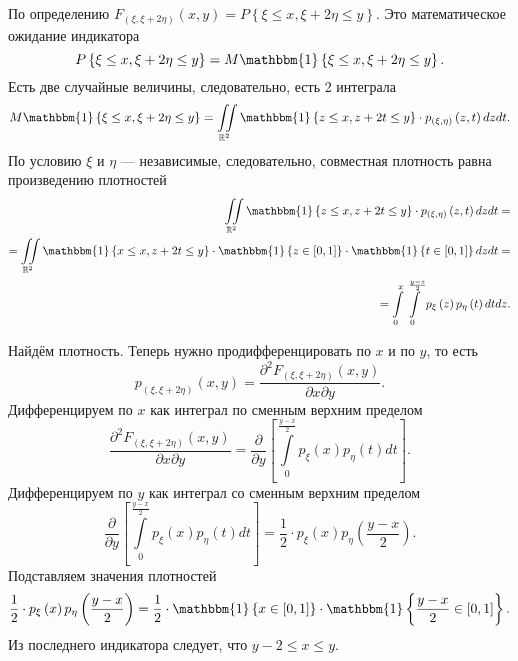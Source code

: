 \begin{enumerate}[label=\alph*)]
  По определению
  $F_{ \left( \xi, \xi + 2 \eta \right) } \left( x, y \right) =
    P \left\{ \xi \leq x, \xi + 2 \eta \leq y \right\} $.
  Это математическое ожидание индикатора
  $$P \left\{ \xi \leq x, \xi + 2 \eta \leq y \right\} =
    M \mathbbm{1} \left\{ \xi \leq x, \xi + 2 \eta \leq y \right\}.$$
  Есть две случайные величины, следовательно, есть 2 интеграла
  $$M \mathbbm{1} \left\{ \xi \leq x, \xi + 2 \eta \leq y \right\} =
    \iint \limits_{ \mathbb{R}^2}
      \mathbbm{1} \left\{ z \leq x, z + 2t \leq y \right\} \cdot
      p_{ \left( \xi, \eta \right) } \left( z, t \right)
    dzdt.$$
  По условию $ \xi $ и $ \eta $ --- независимые, следовательно,
  совместная плотность равна произведению плотностей
  \begin{equation*}
    \begin{split}
      \iint \limits_{ \mathbb{R}^2}
        \mathbbm{1} \left\{ z \leq x, z + 2t \leq y \right\} \cdot
        p_{ \left( \xi, \eta \right) } \left( z, t \right)
      dzdt = \\
      = \iint \limits_{ \mathbb{R}^2}
        \mathbbm{1} \left\{ x \leq x, z + 2t \leq y \right\} \cdot
        \mathbbm{1} \left\{ z \in \left[ 0, 1 \right] \right\} \cdot
        \mathbbm{1} \left\{ t \in \left[ 0, 1 \right] \right\}
      dzdt = \\
      = \int \limits_0^x
        \int \limits_0^{ \frac{y - z}{2}} p_{ \xi } \left( z \right) p_{ \eta } \left( t \right) dt
      dz.
    \end{split}
  \end{equation*}

  Найдём плотность.
  Теперь нужно продифференцировать по $x$ и по $y$, то есть
  $$p_{ \left( \xi, \xi + 2 \eta \right) } \left( x, y \right) =
    \frac{ \partial^2 F_{ \left( \xi, \xi + 2 \eta \right) } \left( x, y \right) }{ \partial x \partial y}.$$
  Дифференцируем по $x$ как интеграл по сменным верхним пределом
  $$ \frac{ \partial^2 F_{ \left( \xi, \xi + 2 \eta \right) } \left( x, y \right) }{ \partial x \partial y} =
    \frac{ \partial }{ \partial y} \left[
      \int \limits_0^{ \frac{y - x}{2}} p_{ \xi } \left( x \right) p_{ \eta } \left( t \right) dt
    \right].$$
  Дифференцируем по $y$ как интеграл со сменным верхним пределом
  $$ \frac{ \partial }{ \partial y} \left[
      \int \limits_0^{ \frac{y - x}{2}} p_{ \xi } \left( x \right) p_{ \eta } \left( t \right) dt
    \right] =
    \frac{1}{2} \cdot p_{ \xi } \left( x \right) p_{ \eta } \left( \frac{y - x}{2} \right).$$
  Подставляем значения плотностей
  $$ \frac{1}{2} \cdot p_{ \xi } \left( x \right) p_{ \eta } \left( \frac{y - x}{2} \right) =
    \frac{1}{2} \cdot
    \mathbbm{1} \left\{ x \in \left[ 0, 1 \right] \right\} \cdot
    \mathbbm{1} \left\{ \frac{y - x}{2} \in \left[ 0, 1 \right] \right\}.$$
  Из последнего индикатора следует, что $y - 2 \leq x \leq y$.


\end{enumerate}
